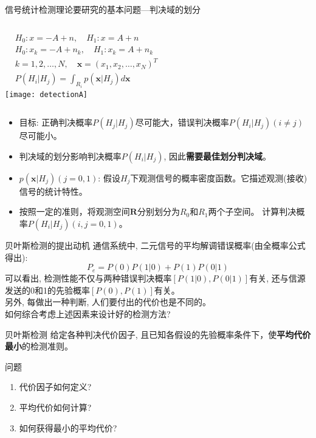 \begin{frame}{信号统计检测理论要研究的基本问题---判决域的划分}
\begin{columns}
	\begin{align*}
	&H_0: x=-A+n,\quad H_1: x=A+n\\
	&H_0: x_k=-A+n_k,\quad H_1: x_k=A+n_k\\
	&k=1,2,\dots,N,\quad \bm{x}=(x_1,x_2,\dots,x_N)^{T}\\
	&P(H_i|H_j)=\int_{R_i}p(\bm{x}|H_j)d\bm{x}
	\end{align*}
	\texttt{[image: detectionA]}
\end{columns}
\begin{itemize}
	\item 目标: 正确判决概率$P(H_j|H_j)$尽可能大，错误判决概率$P(H_i|H_j)(i\ne j)$尽可能小。
	\item 判决域的划分影响判决概率$P(H_i|H_j)$, 因此\textbf{需要最佳划分判决域}。
	\item $p(\bm{x}|H_j)(j=0,1)$: 假设$H_j$下观测信号的概率密度函数。它描述观测(接收)信号的统计特性。
	\item 按照一定的准则，将观测空间$\bm{R}$分别划分为$R_0$和$R_1$两个子空间。
	计算判决概率$P(H_i|H_j)(i,j=0,1)$。	
\end{itemize}
\end{frame}

\begin{frame}{贝叶斯检测的提出动机}
通信系统中, 二元信号的平均解调错误概率(由全概率公式得出):
\[ P_e=P(0)P(1|0)+P(1)P(0|1)\]
可以看出, 检测性能不仅与两种错误判决概率$[P(1|0),P(0|1)]$有关, 还与信源发送的0和1的先验概率$[P(0),P(1)]$有关。\\
另外, 每做出一种判断, 人们要付出的代价也是不同的。\\
如何综合考虑上述因素来设计好的检测方法?
\begin{block}{贝叶斯检测}
	给定各种判决代价因子, 且已知各假设的先验概率条件下，使\textbf{平均代价最小}的检测准则。
\end{block}
\end{frame}

\begin{frame}{问题}
\begin{enumerate}
	\item 代价因子如何定义?
	\item 平均代价如何计算?
	\item 如何获得最小的平均代价?
\end{enumerate}
\end{frame}

